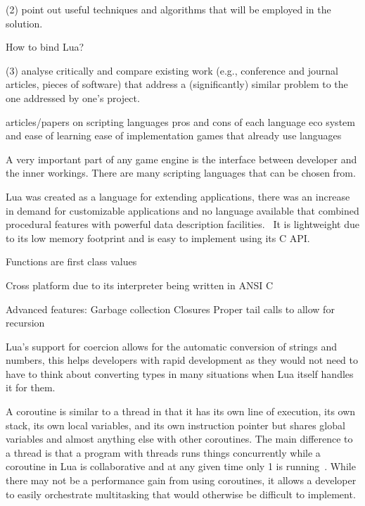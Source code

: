 \documentclass[11pt,a4paper,titlepage]{article}
\begin{document}
	(2) point out useful techniques and algorithms that will be employed in the solution. 
		
		How to bind Lua?
		
	(3) analyse critically and compare existing work (e.g., conference and journal articles, pieces of software) that address a (significantly) similar	problem to the one addressed by one’s project.
	
		articles/papers on scripting languages
		pros and cons of each language
			eco system and ease of learning
			ease of implementation
		games that already use languages
		
		A very important part of any game engine is the interface between developer and the inner workings. There are many scripting languages that can be chosen from.
		
		\newpage

		Lua was created as a language for extending applications, there was an increase in demand for customizable applications and no language available that combined procedural features with powerful data description facilities.~\cite{Ierusalimschy02software} It is lightweight due to its low memory footprint and is easy to implement using its C API.

		Functions are first class values

		Cross platform due to its interpreter being written in ANSI C

		Advanced features:
		Garbage collection
		Closures
		Proper tail calls to allow for recursion

		Lua's support for coercion allows for the automatic conversion of strings and numbers, this helps developers with rapid development as they would not need to have to think about converting types in many situations when Lua itself handles it for them.

		A coroutine is similar to a thread in that it has its own line of execution, its own stack, its own local variables, and its own instruction pointer but shares global variables and almost anything else with other coroutines. The main difference to a thread is that a program with threads runs things concurrently while a coroutine in Lua is collaborative and at any given time only 1 is running~\cite{Ierusalimschy:2013:PLT:2502646}. While there may not be a performance gain from using coroutines, it allows a developer to easily orchestrate multitasking that would otherwise be difficult to implement.
\end{document}
